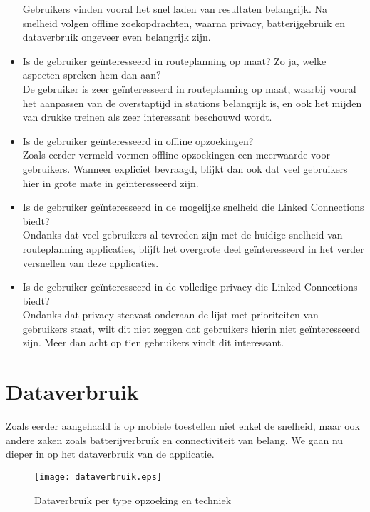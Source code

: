 \begin{itemize}
	Gebruikers vinden vooral het snel laden van resultaten belangrijk. Na snelheid volgen offline zoekopdrachten, waarna privacy, batterijgebruik en dataverbruik ongeveer even belangrijk zijn.
	\item Is de gebruiker geïnteresseerd in routeplanning op maat? Zo ja, welke aspecten spreken hem dan aan?\\
	De gebruiker is zeer geïnteresseerd in routeplanning op maat, waarbij vooral het aanpassen van de overstaptijd in stations belangrijk is, en ook het mijden van drukke treinen als zeer interessant beschouwd wordt.
	\item Is de gebruiker geïnteresseerd in offline opzoekingen?\\
	Zoals eerder vermeld vormen offline opzoekingen een meerwaarde voor gebruikers. Wanneer expliciet bevraagd, blijkt dan ook dat veel gebruikers hier in grote mate in geïnteresseerd zijn.
	\item Is de gebruiker geïnteresseerd in de mogelijke snelheid die Linked Connections biedt?\\
	Ondanks dat veel gebruikers al tevreden zijn met de huidige snelheid van routeplanning applicaties, blijft het overgrote deel geïnteresseerd in het verder versnellen van deze applicaties.
	\item Is de gebruiker geïnteresseerd in de volledige privacy die Linked Connections biedt?\\
	Ondanks dat privacy steevast onderaan de lijst met prioriteiten van gebruikers staat, wilt dit niet zeggen dat gebruikers hierin niet geïnteresseerd zijn. Meer dan acht op tien gebruikers vindt dit interessant.
\end{itemize}

\section{Dataverbruik}
Zoals eerder aangehaald is op mobiele toestellen niet enkel de snelheid, maar ook andere zaken zoals batterijverbruik en connectiviteit van belang. We gaan nu dieper in op het dataverbruik van de applicatie. 

\begin{figure}[ht]
	\centering
	\texttt{[image: dataverbruik.eps]}
	\caption[Dataverbruik per opzoeking]{Dataverbruik per type opzoeking en techniek}
	\label{fig:dataUsage}
\end{figure}

